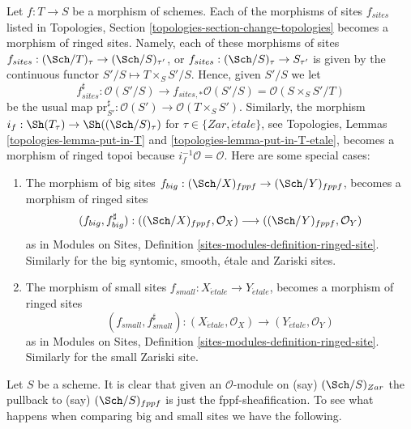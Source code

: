 \begin{remark}
\label{remark-change-topologies-ringed}
Let $f : T \to S$ be a morphism of schemes.
Each of the morphisms of sites $f_{sites}$ listed in
Topologies, Section \ref{topologies-section-change-topologies}
becomes a morphism of ringed sites. Namely, each of these morphisms of sites
$f_{sites} : (\Sch/T)_\tau \to (\Sch/S)_{\tau'}$, or
$f_{sites} : (\Sch/S)_\tau \to S_{\tau'}$ is given by the continuous
functor $S'/S \mapsto T \times_S S'/S$. Hence, given $S'/S$ we let
$$
f_{sites}^\sharp :
\mathcal{O}(S'/S)
\longrightarrow
f_{sites, *}\mathcal{O}(S'/S) =
\mathcal{O}(S \times_S S'/T)
$$
be the usual map
$\text{pr}_{S'}^\sharp : \mathcal{O}(S') \to \mathcal{O}(T \times_S S')$.
Similarly, the morphism
$i_f : \Sh(T_\tau) \to \Sh((\Sch/S)_\tau)$
for $\tau \in \{Zar, \acute{e}tale\}$, see
Topologies, Lemmas \ref{topologies-lemma-put-in-T} and
\ref{topologies-lemma-put-in-T-etale},
becomes a morphism of ringed topoi because $i_f^{-1}\mathcal{O} = \mathcal{O}$.
Here are some special cases:
\begin{enumerate}
\item The morphism of big sites
$f_{big} : (\Sch/X)_{fppf} \to (\Sch/Y)_{fppf}$,
becomes a morphism of ringed sites
$$
(f_{big}, f_{big}^\sharp) :
((\Sch/X)_{fppf}, \mathcal{O}_X)
\longrightarrow
((\Sch/Y)_{fppf}, \mathcal{O}_Y)
$$
as in Modules on Sites, Definition \ref{sites-modules-definition-ringed-site}.
Similarly for the big syntomic, smooth, \'etale and Zariski sites.
\item The morphism of small sites
$f_{small} : X_{\acute{e}tale} \to Y_{\acute{e}tale}$,
becomes a morphism of ringed sites
$$
(f_{small}, f_{small}^\sharp) :
(X_{\acute{e}tale}, \mathcal{O}_X)
\longrightarrow
(Y_{\acute{e}tale}, \mathcal{O}_Y)
$$
as in Modules on Sites, Definition \ref{sites-modules-definition-ringed-site}.
Similarly for the small Zariski site.
\end{enumerate}
\end{remark}

\noindent
Let $S$ be a scheme. It is clear that given an $\mathcal{O}$-module on (say)
$(\Sch/S)_{Zar}$ the pullback to (say) $(\Sch/S)_{fppf}$
is just the fppf-sheafification. To see what happens when comparing
big and small sites we have the following.

